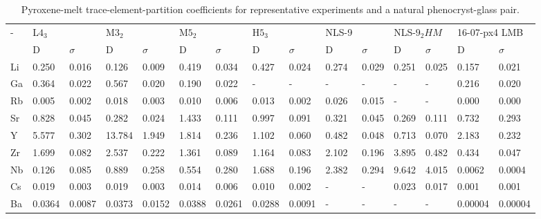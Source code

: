 \documentclass[final,authoryear,3p,times,twocolumn]{elsarticle}
\begin{document}
\begin{table}[htpb]
\centering
\caption{Pyroxene-melt trace-element-partition coefficients for representative experiments and a natural phenocryst-glass pair.}
\label{D_table}
\begin{adjustbox}{max width=\textwidth}
\begin{tabular}{@{}lllllllllllllll@{}}
\toprule
-  & L$4_3$  &        & M$3_2$  &        & M$5_2$  &        & H$5_3$  &        & NLS-9  &        & \multicolumn{2}{l}{NLS-$9_2 HM$} & \multicolumn{2}{l}{16-07-px4 LMB} \\ 
   & D      & $\sigma$      & D      & $\sigma$      & D      & $\sigma$      & D      & $\sigma$      & D      & $\sigma$      & D              & $\sigma$              & D                & $\sigma$               \\ \midrule
Li & 0.250  & 0.016  & 0.126  & 0.009  & 0.419  & 0.034  & 0.427  & 0.024  & 0.274  & 0.029  & 0.251          & 0.025          & 0.157            & 0.021           \\
Ga & 0.364  & 0.022  & 0.567  & 0.020  & 0.190  & 0.022  & -      & -      & -      & -      & -              & -              & 0.216            & 0.020           \\
Rb & 0.005  & 0.002  & 0.018  & 0.003  & 0.010  & 0.006  & 0.013  & 0.002  & 0.026  & 0.015  & -              & -              & 0.000            & 0.000           \\
Sr & 0.828  & 0.045  & 0.282  & 0.024  & 1.433  & 0.111  & 0.997  & 0.091  & 0.321  & 0.045  & 0.269          & 0.111          & 0.732            & 0.293           \\
Y  & 5.577  & 0.302  & 13.784 & 1.949  & 1.814  & 0.236  & 1.102  & 0.060  & 0.482  & 0.048  & 0.713          & 0.070          & 2.183            & 0.232           \\
Zr & 1.699  & 0.082  & 2.537  & 0.222  & 1.361  & 0.089  & 1.164  & 0.083  & 2.102  & 0.196  & 3.895          & 0.482          & 0.434            & 0.047           \\
Nb & 0.126  & 0.085  & 0.889  & 0.258  & 0.554  & 0.280  & 1.688  & 0.196  & 2.382  & 0.294  & 9.642          & 4.015          & 0.0062           & 0.0004          \\
Cs & 0.019  & 0.003  & 0.019  & 0.003  & 0.014  & 0.006  & 0.010  & 0.002  & -      & -      & 0.023          & 0.017          & 0.001            & 0.001           \\
Ba & 0.0364 & 0.0087 & 0.0373 & 0.0152 & 0.0388 & 0.0261 & 0.0288 & 0.0091 & -      & -      & -              & -              & 0.00004          & 0.00004         \\

\end{tabular}
\end{adjustbox}
\end{table}
\end{document}
